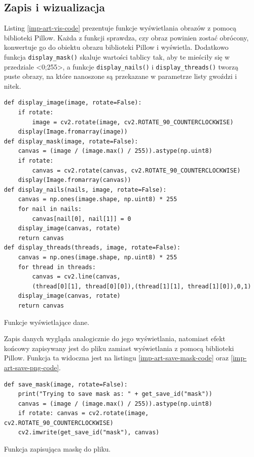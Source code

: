         \subsection{Zapis i wizualizacja} \label{imp-art-wiz}
        Listing \ref{imp-art-vis-code} prezentuje funkcje wyświetlania obrazów z pomocą biblioteki Pillow. Każda z funkcji sprawdza, czy obraz powinien zostać obrócony, konwertuje go do obiektu obrazu biblioteki Pillow i wyświetla. Dodatkowo funkcja \texttt{display_mask()} skaluje wartości tablicy tak, aby te mieściły się w przedziale <0;255>, a funkcje \texttt{display_nails()} i \texttt{display_threads()} tworzą puste obrazy, na które nanoszone są przekazane w parametrze listy gwoździ i nitek. 
        \begin{code}[H]
        \begin{verbatim}
def display_image(image, rotate=False):
    if rotate:
        image = cv2.rotate(image, cv2.ROTATE_90_COUNTERCLOCKWISE)
    display(Image.fromarray(image))
def display_mask(image, rotate=False):
    canvas = (image / (image.max() / 255)).astype(np.uint8)
    if rotate:
        canvas = cv2.rotate(canvas, cv2.ROTATE_90_COUNTERCLOCKWISE)
    display(Image.fromarray(canvas))
def display_nails(nails, image, rotate=False):
    canvas = np.ones(image.shape, np.uint8) * 255
    for nail in nails:
        canvas[nail[0], nail[1]] = 0
    display_image(canvas, rotate)
    return canvas
def display_threads(threads, image, rotate=False):
    canvas = np.ones(image.shape, np.uint8) * 255
    for thread in threads:
        canvas = cv2.line(canvas, 
        (thread[0][1], thread[0][0]),(thread[1][1], thread[1][0]),0,1)
    display_image(canvas, rotate)
    return canvas
        \end{verbatim}
        \caption{Funkcje wyświetlające dane.}
        \label{imp-art-vis-code}
        \end{code}
        
        Zapis danych wygląda analogicznie do jego wyświetlania, natomiast efekt końcowy zapisywany jest do pliku zamiast wyświetlania z pomocą biblioteki Pillow. Funkcja ta widoczna jest na listingu \ref{imp-art-save-mask-code} oraz \ref{imp-art-save-png-code}.
        \begin{code}[H]
        \begin{verbatim}
def save_mask(image, rotate=False):
    print("Trying to save mask as: " + get_save_id("mask"))
    canvas = (image / (image.max() / 255)).astype(np.uint8)
    if rotate: canvas = cv2.rotate(image, cv2.ROTATE_90_COUNTERCLOCKWISE)
    cv2.imwrite(get_save_id("mask"), canvas)
        \end{verbatim}
        \caption{Funkcja zapisująca maskę do pliku.}
        \label{imp-art-save-mask-code}
        \end{code}
        
